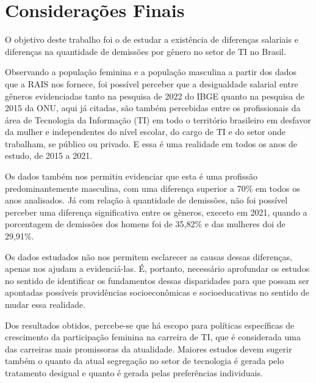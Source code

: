 \section{Considerações Finais}

O objetivo deste trabalho foi o de estudar a existência de diferenças salariais e diferenças na quantidade de demissões por gênero no setor de TI no Brasil.

Observando a população feminina e a população masculina a partir dos dados que a RAIS nos fornece, foi possível perceber que a desigualdade salarial entre gêneros evidenciadas tanto na pesquisa de 2022 do IBGE quanto na pesquisa de 2015 da ONU, aqui já citadas,  são também percebidas entre os profissionais da área de Tecnologia da Informação (TI) em todo o território brasileiro em desfavor da mulher e independentes do nível escolar, do cargo de TI e do setor onde trabalham, se público ou privado. E essa é uma realidade em todos os anos de estudo, de 2015 a 2021.

Os dados também nos permitiu evidenciar que esta é uma profissão predominantemente masculina, com uma diferença superior a 70\% em todos os anos analisados. Já com relação à quantidade de demissões, não foi possível perceber uma diferença significativa entre os gêneros, execeto em 2021, quando a porcentagem de demissões dos homens foi de 35,82\% e das mulheres doi de 29,91\%.

Os dados estudados não nos permitem esclarecer as causas dessas diferenças, apenas nos ajudam a evidenciá-las. É, portanto, necessário aprofundar os estudos no sentido de identificar os fundamentos dessas disparidades para que possam ser apontadas possíveis providências socioeconômicas e socioeducativas no sentido de mudar essa realidade. 

Dos resultados obtidos, percebe-se que há escopo para políticas específicas de crescimento da participação feminina na carreira de TI, que é considerada uma das carreiras mais promissoras da atualidade. Maiores estudos devem sugerir também o quanto da atual segregação no setor de tecnologia é gerada pelo tratamento desigual e quanto é gerada pelas preferências individuais.




